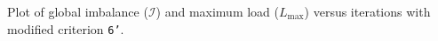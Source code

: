 Plot of global imbalance ($\mathcal{I}$) and maximum load ($L_{\max}$) versus iterations with modified criterion \texttt{6'}.
